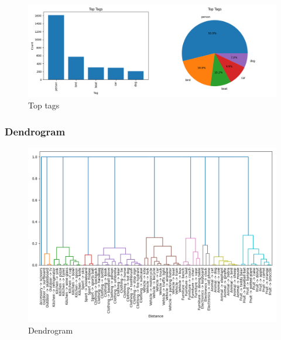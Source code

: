 \documentclass{article}
\begin{document}
    \begin{figure}[htbp]
        \centering
        \includegraphics[width=0.85 \textwidth]{img/tags}
        \caption{Top tags}
        \label{fig:top_tags}
    \end{figure}

    \subsubsection{Dendrogram}\label{subsubsec:dendrogram}

    \begin{figure}[htbp]
        \centering
        \includegraphics[width=1 \textwidth]{img/dendrogram}
        \caption{Dendrogram}
        \label{fig:dendrogram}
    \end{figure}
\end{document}
